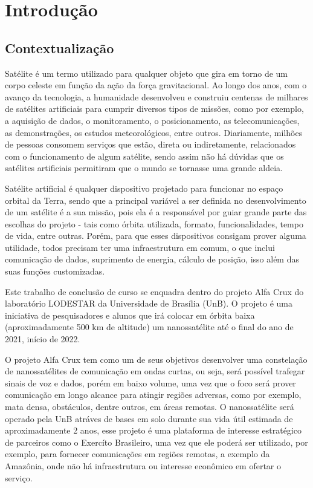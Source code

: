 \chapter{Introdução} \label{introducao}
\section{Contextualização}
Satélite é um termo utilizado para qualquer objeto que gira em torno de um corpo celeste em função da ação da força gravitacional. Ao longo dos anos, com o avanço da tecnologia, a humanidade desenvolveu e construiu centenas de milhares de satélites artificiais para cumprir diversos tipos de missões, como por exemplo, a  aquisição de dados, o monitoramento, o posicionamento, as telecomunicações, as demonstrações, os estudos meteorológicos, entre outros. Diariamente, milhões de pessoas consomem serviços que estão, direta ou indiretamente, relacionados com o funcionamento de algum satélite, sendo assim não há dúvidas que os satélites artificiais permitiram que o mundo se tornasse uma grande aldeia.

Satélite artificial é qualquer dispositivo projetado para funcionar no espaço orbital da Terra, sendo que a principal variável a ser definida no desenvolvimento de um satélite é a sua missão, pois ela é a responsável por guiar grande parte das escolhas do projeto - tais como órbita utilizada, formato, funcionalidades, tempo de vida, entre outras. Porém, para que esses dispositivos consigam prover alguma utilidade, todos precisam ter uma infraestrutura em comum, o que inclui comunicação de dados, suprimento de energia, cálculo de posição, isso além das suas funções customizadas.\cite{nasa_comms_article} 

Este trabalho de conclusão de curso se enquadra dentro do projeto Alfa Crux do laboratório LODESTAR da Universidade de Brasília (UnB). O projeto é uma iniciativa de pesquisadores e alunos que irá colocar em órbita baixa (aproximadamente 500 km de altitude) um nanossatélite até o final do ano de 2021, início de 2022.

O projeto Alfa Crux tem como um de seus objetivos desenvolver uma constelação de nanossatélites de comunicação em ondas curtas, ou seja, será possível trafegar sinais de voz e dados, porém em baixo volume, uma vez que o foco será prover comunicação em longo alcance para atingir regiões adversas, como por exemplo, mata densa, obstáculos, dentre outros, em áreas remotas. O nanossatélite será operado pela UnB atráves de bases em solo durante sua vida útil estimada de aproximadamente 2 anos, esse projeto é uma plataforma de interesse estratégico de parceiros como o Exercíto Brasileiro, uma vez que ele poderá ser utilizado, por exemplo, para fornecer comunicações em regiões remotas, a exemplo da Amazônia, onde não há infraestrutura ou interesse econômico em ofertar o serviço. 


